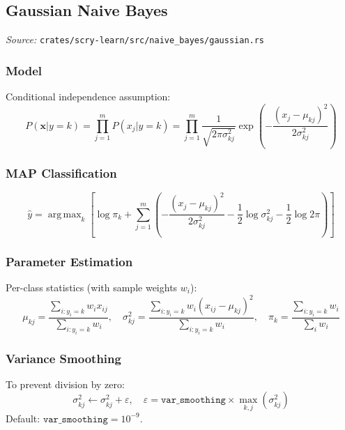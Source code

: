 \documentclass[11pt,a4paper]{article}
\theoremstyle{definition}
\theoremstyle{remark}
\DeclareMathOperator*{\argmax}{arg\,max}
\begin{document}
\subsection{Gaussian Naive Bayes}
\label{sec:gnb}

\noindent\textit{Source:} \texttt{crates/scry-learn/src/naive\_bayes/gaussian.rs}

\subsubsection*{Model}

Conditional independence assumption:
\begin{equation}
P(\mathbf{x}|y=k) = \prod_{j=1}^m P(x_j|y=k) = \prod_{j=1}^m \frac{1}{\sqrt{2\pi\sigma_{kj}^2}}\exp\left(-\frac{(x_j - \mu_{kj})^2}{2\sigma_{kj}^2}\right)
\end{equation}

\subsubsection*{MAP Classification}
\begin{equation}
\hat{y} = \argmax_k \left[\log\pi_k + \sum_{j=1}^m\left(-\frac{(x_j - \mu_{kj})^2}{2\sigma_{kj}^2} - \frac{1}{2}\log\sigma_{kj}^2 - \frac{1}{2}\log 2\pi\right)\right]
\end{equation}

\subsubsection*{Parameter Estimation}

Per-class statistics (with sample weights $w_i$):
\begin{equation}
\mu_{kj} = \frac{\sum_{i: y_i=k} w_i x_{ij}}{\sum_{i: y_i=k} w_i}, \quad \sigma_{kj}^2 = \frac{\sum_{i: y_i=k} w_i(x_{ij} - \mu_{kj})^2}{\sum_{i: y_i=k} w_i}, \quad \pi_k = \frac{\sum_{i: y_i=k} w_i}{\sum_i w_i}
\end{equation}

\subsubsection*{Variance Smoothing}

To prevent division by zero:
\begin{equation}
\sigma_{kj}^2 \leftarrow \sigma_{kj}^2 + \varepsilon, \quad \varepsilon = \texttt{var\_smoothing} \times \max_{k,j}(\sigma_{kj}^2)
\end{equation}
Default: $\texttt{var\_smoothing} = 10^{-9}$.
\end{document}
